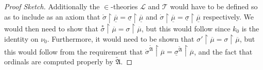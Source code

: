 \documentclass{amsart}
\theoremstyle{definition}
\theoremstyle{remark}
\newcommand{\rest}{\mathbin{\upharpoonright}}
\begin{document}
\begin{proof}[Proof Sketch]
Additionally the $\in$-theories $\mathcal L$ and $\mathcal T$ would have to be defined so as to include as an axiom that $\mathring \sigma \rest \overline{\underline{\mu}} = \underline{\sigma} \rest \overline{\underline \mu}$ and $\dot \sigma \rest \overline{\underline{\mu}} = \underline{\sigma} \rest \overline{\underline \mu}$ respectively. 
We would then need to show that $\overset{*}\sigma \rest \overline{\mu} = \sigma \rest \overline{\mu}$, but this would follow since $k_0$ is the identity on $\nu_0$. 
Furthermore, it would need to be shown that $\sigma' \rest \overline{\mu} = \sigma \rest \overline{\mu}$, but this would follow from the requirement that $\dot \sigma^{\tilde{\mathfrak A}} \rest \overline{\mu} = \underline{\sigma}^{\tilde{\mathfrak A}} \rest \overline{\mu}$, and the fact that ordinals are computed properly by $\tilde{\mathfrak A}$. 
\end{proof}




\end{document}
